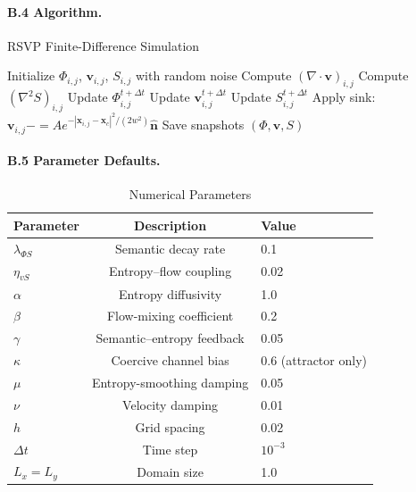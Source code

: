 \documentclass[12pt]{article}
\begin{document}
\paragraph{B.4 Algorithm.}

\begin{algorithm}
\caption{RSVP Finite-Difference Simulation}
\begin{algorithmic}[1]
\State Initialize \(\Phi_{i,j}\), \(\mathbf{v}_{i,j}\), \(S_{i,j}\) with random noise
  \State Compute \((\nabla \cdot \mathbf{v})_{i,j}\)
  \State Compute \((\nabla^2 S)_{i,j}\)
  \State Update \(\Phi_{i,j}^{t+\Delta t}\)
  \State Update \(\mathbf{v}_{i,j}^{t+\Delta t}\)
  \State Update \(S_{i,j}^{t+\Delta t}\)
    \State Apply sink: \(\mathbf{v}_{i,j} \mathrel{-{=}} A e^{-|\mathbf{x}_{i,j} - \mathbf{x}_c|^2 / (2 w^2)} \mathbf{\hat{n}}\)
  \EndIf
    \State Save snapshots \((\Phi, \mathbf{v}, S)\)
  \EndIf
\EndFor
\end{algorithmic}
\end{algorithm}

\paragraph{B.5 Parameter Defaults.}

\begin{table}[h]
\caption{Numerical Parameters}
\begin{center}
\begin{tabular}{lcl}
\toprule
Parameter & Description & Value \\
\midrule
\(\lambda_{\Phi S}\) & Semantic decay rate & 0.1 \\
\(\eta_{vS}\) & Entropy–flow coupling & 0.02 \\
\(\alpha\) & Entropy diffusivity & 1.0 \\
\(\beta\) & Flow-mixing coefficient & 0.2 \\
\(\gamma\) & Semantic–entropy feedback & 0.05 \\
\(\kappa\) & Coercive channel bias & 0.6 (attractor only) \\
\(\mu\) & Entropy-smoothing damping & 0.05 \\
\(\nu\) & Velocity damping & 0.01 \\
\(h\) & Grid spacing & 0.02 \\
\(\Delta t\) & Time step & \(10^{-3}\) \\
\(L_x = L_y\) & Domain size & 1.0 \\
\bottomrule
\end{tabular}
\end{center}
\end{table}
\end{document}
